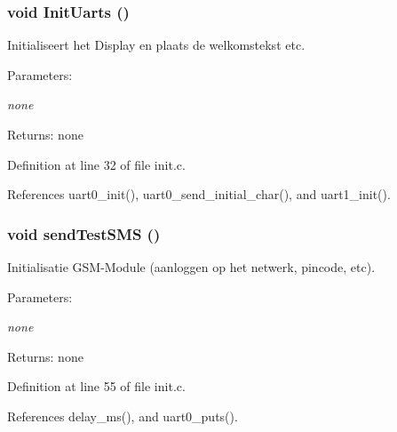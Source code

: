 \subsubsection{\setlength{\rightskip}{0pt plus 5cm}void InitUarts ()}\label{init_8h_7b2d590b69c4a0a9fc52ccf2d5d94c10}


Initialiseert het Display en plaats de welkomstekst etc. 

\begin{Desc}
\item[Parameters:]
\begin{description}
\item[{\em none}]\end{description}
\end{Desc}
\begin{Desc}
\item[Returns:]none \end{Desc}


Definition at line 32 of file init.c.

References uart0\_\-init(), uart0\_\-send\_\-initial\_\-char(), and uart1\_\-init().
\subsubsection{\setlength{\rightskip}{0pt plus 5cm}void sendTestSMS ()}\label{init_8h_ebfcbbbbc20b31b0e209dd6e122eaf51}


Initialisatie GSM-Module (aanloggen op het netwerk, pincode, etc). 

\begin{Desc}
\item[Parameters:]
\begin{description}
\item[{\em none}]\end{description}
\end{Desc}
\begin{Desc}
\item[Returns:]none \end{Desc}


Definition at line 55 of file init.c.

References delay\_\-ms(), and uart0\_\-puts().